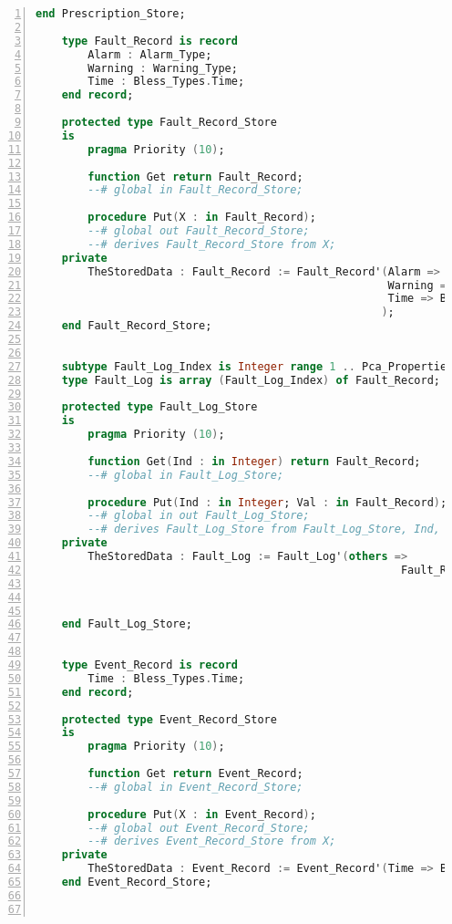 \begin{lstlisting}[language=ada, gobble=0, numbers=left, caption={\lstinline{Pca_Types} package}, label={listing:pca_generated:pca_types}]
    end Prescription_Store;

    type Fault_Record is record
        Alarm : Alarm_Type;
        Warning : Warning_Type;
        Time : Bless_Types.Time;
    end record;

    protected type Fault_Record_Store
    is
        pragma Priority (10);

        function Get return Fault_Record;
        --# global in Fault_Record_Store;

        procedure Put(X : in Fault_Record);
        --# global out Fault_Record_Store;
        --# derives Fault_Record_Store from X;
    private
        TheStoredData : Fault_Record := Fault_Record'(Alarm => Alarm_Type'First,
                                                      Warning => Warning_Type'First,
                                                      Time => Bless_Types.Time'First
                                                     );
    end Fault_Record_Store;


    subtype Fault_Log_Index is Integer range 1 .. Pca_Properties.Fault_Log_Size;
    type Fault_Log is array (Fault_Log_Index) of Fault_Record;

    protected type Fault_Log_Store
    is
        pragma Priority (10);

        function Get(Ind : in Integer) return Fault_Record;
        --# global in Fault_Log_Store;

        procedure Put(Ind : in Integer; Val : in Fault_Record);
        --# global in out Fault_Log_Store;
        --# derives Fault_Log_Store from Fault_Log_Store, Ind, Val;
    private
        TheStoredData : Fault_Log := Fault_Log'(others =>
                                                        Fault_Record'(Alarm => Alarm_Type'First,
                                                                      Warning => Warning_Type'First,
                                                                      Time => Bless_Types.Time'First
                                                                     ));
    end Fault_Log_Store;


    type Event_Record is record
        Time : Bless_Types.Time;
    end record;

    protected type Event_Record_Store
    is
        pragma Priority (10);

        function Get return Event_Record;
        --# global in Event_Record_Store;

        procedure Put(X : in Event_Record);
        --# global out Event_Record_Store;
        --# derives Event_Record_Store from X;
    private
        TheStoredData : Event_Record := Event_Record'(Time => Bless_Types.Time'First);
    end Event_Record_Store;



\end{lstlisting}
